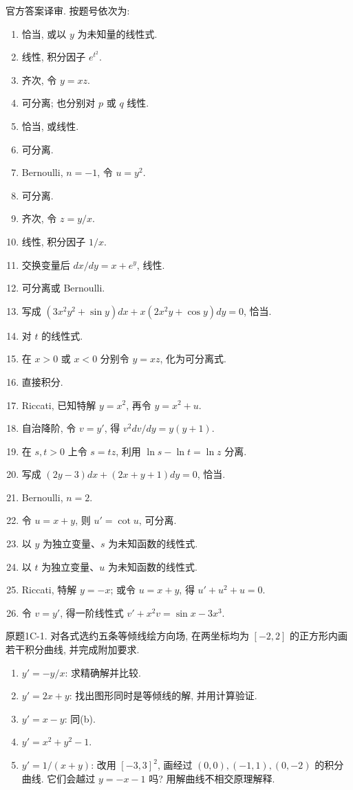 \begin{solution}
官方答案译审. 按题号依次为:
\begin{enumerate}[label=\arabic*.]
\item 恰当, 或以 $y$ 为未知量的线性式.
\item 线性, 积分因子 $e^{t^2}$.
\item 齐次, 令 $y=xz$.
\item 可分离; 也分别对 $p$ 或 $q$ 线性.
\item 恰当, 或线性.
\item 可分离.
\item Bernoulli, $n=-1$, 令 $u=y^2$.
\item 可分离.
\item 齐次, 令 $z=y/x$.
\item 线性, 积分因子 $1/x$.
\item 交换变量后 $dx/dy=x+e^y$, 线性.
\item 可分离或 Bernoulli.
\item 写成 $(3x^2y^2+\sin y)dx+x(2x^2y+\cos y)dy=0$, 恰当.
\item 对 $t$ 的线性式.
\item 在 $x>0$ 或 $x<0$ 分别令 $y=xz$, 化为可分离式.
\item 直接积分.
\item Riccati, 已知特解 $y=x^2$, 再令 $y=x^2+u$.
\item 自治降阶, 令 $v=y'$, 得 $v^2dv/dy=y(y+1)$.
\item 在 $s,t>0$ 上令 $s=tz$, 利用 $\ln s-\ln t=\ln z$ 分离.
\item 写成 $(2y-3)dx+(2x+y+1)dy=0$, 恰当.
\item Bernoulli, $n=2$.
\item 令 $u=x+y$, 则 $u'=\cot u$, 可分离.
\item 以 $y$ 为独立变量、$s$ 为未知函数的线性式.
\item 以 $t$ 为独立变量、$u$ 为未知函数的线性式.
\item Riccati, 特解 $y=-x$; 或令 $u=x+y$, 得 $u'+u^2+u=0$.
\item 令 $v=y'$, 得一阶线性式 $v'+x^2v=\sin x-3x^3$.
\end{enumerate}
\end{solution}
\begin{exercise}\label{cw:bank-1C-1}
原题1C-1. 对各式选约五条等倾线绘方向场, 在两坐标均为 $[-2,2]$ 的正方形内画若干积分曲线, 并完成附加要求.
\begin{enumerate}[label=\alph*)]
\item $y'=-y/x$: 求精确解并比较.
\item $y'=2x+y$: 找出图形同时是等倾线的解, 并用计算验证.
\item $y'=x-y$: 同(b).
\item $y'=x^2+y^2-1$.
\item $y'=1/(x+y)$: 改用 $[-3,3]^2$, 画经过 $(0,0),(-1,1),(0,-2)$ 的积分曲线. 它们会越过 $y=-x-1$ 吗? 用解曲线不相交原理解释.
\end{enumerate}
\end{exercise}

